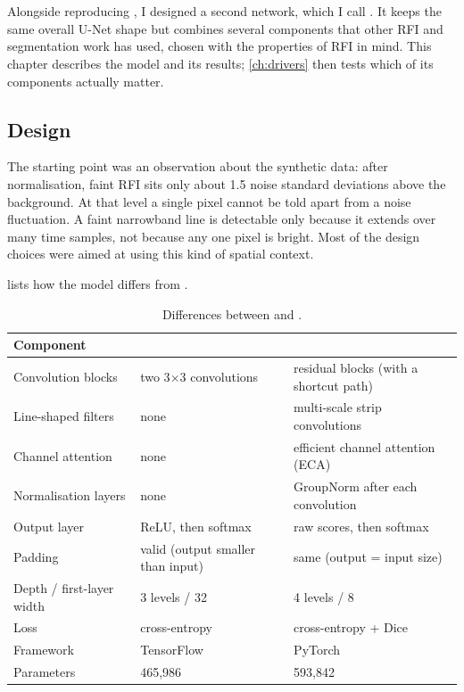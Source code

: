 \chapter{\hybrid}
\label{ch:hybrid}
Alongside reproducing \tfunet{}, I designed a second network, which I call
\hybrid{}. It keeps the same overall U-Net shape but combines several
components that other RFI and segmentation work has used, chosen with the
properties of RFI in mind. This chapter describes the model and its results;
\cref{ch:drivers} then tests which of its components actually matter.

\section{Design}
\label{sec:hybrid_design}
The starting point was an observation about the synthetic data: after
normalisation, faint RFI sits only about 1.5 noise standard deviations above
the background. At that level a single pixel cannot be told apart from a
noise fluctuation. A faint narrowband line is detectable only because it
extends over many time samples, not because any one pixel is bright. Most of
the design choices were aimed at using this kind of spatial context.

 lists how the model differs from \tfunet{}.

\begin{table}[H]
  \centering
  \caption{Differences between \tfunet{} and \hybrid{}.}
  \label{tab:hybrid_vs_tfunet}
  \begin{tabular}{p{3.4cm}p{4.3cm}p{5.2cm}}
    \toprule
    Component & \tfunet{} & \hybrid{} \\
    \midrule
    Convolution blocks & two 3$\times$3 convolutions & residual blocks (with a shortcut path) \\
    Line-shaped filters & none & multi-scale strip convolutions \\
    Channel attention & none & efficient channel attention (ECA) \\
    Normalisation layers & none & GroupNorm after each convolution \\
    Output layer & ReLU, then softmax & raw scores, then softmax \\
    Padding & valid (output smaller than input) & same (output = input size) \\
    Depth / first-layer width & 3 levels / 32 & 4 levels / 8 \\
    Loss & cross-entropy & cross-entropy + Dice \\
    Framework & TensorFlow & PyTorch \\
    Parameters & 465{,}986 & 593{,}842 \\
    \bottomrule
  \end{tabular}
\end{table}

